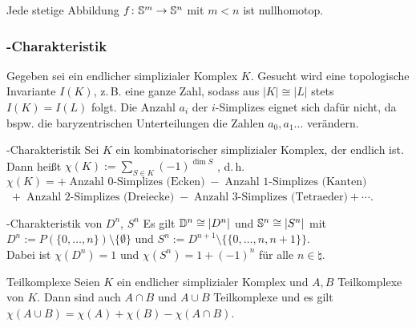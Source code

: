 \begin{Kor}
    Jede stetige Abbildung $f\colon \mathbb{S}^m \rightarrow \mathbb{S}^n$
    mit $m < n$ ist nullhomotop.
\end{Kor}

\pagebreak

\subsubsection{%
    -Charakteristik%
}

\begin{Bem}
    Gegeben sei ein endlicher simplizialer Komplex $K$.
    Gesucht wird eine topologische Invariante $I(K)$, z.\,B. eine ganze Zahl,
    sodass aus $|K| \cong |L|$ stets $I(K) = I(L)$ folgt.
    Die Anzahl $a_i$ der $i$-Simplizes eignet sich dafür nicht, da bspw. die
    baryzentrischen Unterteilungen die Zahlen $a_0, a_1 \dotsc$ verändern.
\end{Bem}

\begin{Def}{-Charakteristik}
    Sei $K$ ein kombinatorischer simplizialer Komplex, der endlich ist. \\
    Dann heißt $\chi(K) := \sum_{S \in K} (-1)^{\dim S}$
    , d.\,h. \\
    $\chi(K) = +\; \text{Anzahl 0-Simplizes (Ecken)}
    \;-\; \text{Anzahl 1-Simplizes (Kanten)}$ \\
    $\;+\; \text{Anzahl 2-Simplizes (Dreiecke)}
    \;-\; \text{Anzahl 3-Simplizes (Tetraeder)} + \dotsb$.
\end{Def}

\begin{Satz}{-Charakteristik von $D^n$, $S^n$}
    Es gilt $\mathbb{D}^n \cong |D^n|$ und $\mathbb{S}^n \cong |S^n|$ mit \\
    $D^n := P(\{0, \dotsc, n\}) \setminus \{\emptyset\}$ und
    $S^n := D^{n+1} \setminus \{\{0, \dotsc, n, n + 1\}\}$. \\
    Dabei ist $\chi(D^n) = 1$ und $\chi(S^n) = 1 + (-1)^n$ für alle
    $n \in \natural$.
\end{Satz}

\begin{Satz}{Teilkomplexe}
    Seien $K$ ein endlicher simplizialer Komplex und $A, B$
    Teilkomplexe von $K$.
    Dann sind auch $A \cap B$ und $A \cup B$ Teilkomplexe und es gilt
    $\chi(A \cup B) = \chi(A) + \chi(B) - \chi(A \cap B)$.
\end{Satz}

